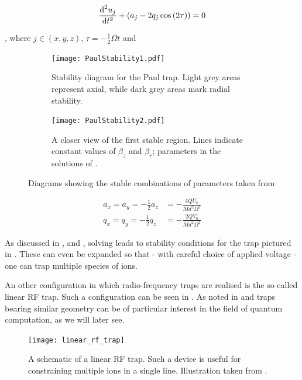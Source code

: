\documentclass[12pt,twoside]{article}
\begin{document}
\begin{equation}
	\der[2]{u_j}{t} + \left(a_j - 2q_j\cos\left(2\tau\right)\right) = 0
	\label{Eq:PaulEqMot}
\end{equation}

, where $j \in \left(x,y,z\right)$, $\tau = -\frac{1}{2}\Omega t$ and

\begin{figure}[t!]
	\centering
	\begin{subfigure}[b]{0.4\textwidth}
		\centering
		\texttt{[image: PaulStability1.pdf]}
		\caption{Stability diagram for the Paul trap. Light grey areas represent axial, while dark grey areas mark radial stability.}
		\label{Fig:PaulStability:Wide}
	\end{subfigure}
	\hfill
	\begin{subfigure}[b]{0.5\textwidth}
		\centering
		\texttt{[image: PaulStability2.pdf]}
		\caption{A closer view of the first stable region. Lines indicate constant values of $\beta_z$ and $\beta_r$; parameters in the solutions of \cite{Charged_Particle_traps_Paul}.}
		\label{Fig:PaulStability:First}
	\end{subfigure}
	\caption[Stability diagrams for a Paul trap]{Diagrams showing the stable combinations of parameters taken from \cite{Charged_Particle_traps_Paul}}
	\label{Fig:PaulStability}
\end{figure}

\begin{align*}
	a_x = a_y = - \frac{1}{2} a_z &= -\frac{4QU_0}{Md^2\Omega^2}\\
	q_x = q_y = - \frac{1}{2} q_z &= -\frac{2QV_0}{Md^2\Omega^2}
\end{align*}

As discussed in \cite{Charged_Particle_traps_Paul}, \cite{Single_trapped_ions} and \cite{RF_Traps}, solving  leads to stability conditions for the trap pictured in . These can even be expanded so that - with careful choice of applied voltage - one can trap multiple species of ions\cite{Foot_two_freq_paul_trap}.

An other configuration in which radio-frequency traps are realised is the so called linear RF trap\cite{RF_Traps,Single_trapped_ions}. Such a configuration can be seen in . As noted in \cite{RF_Traps} and \cite{QI_Application} traps bearing similar geometry can be of particular interest in the field of quantum computation, as we will later see.


\begin{figure}[t!]
	\centering
	\texttt{[image: linear\_rf\_trap]}
	\caption[Linear RF trap diagram]{A schematic of a linear RF trap. Such a device is useful for constraining multiple ions in a single line. Illustration taken from \cite{Single_trapped_ions}.}
	\label{Fig:LinearRF}
\end{figure}
\end{document}
